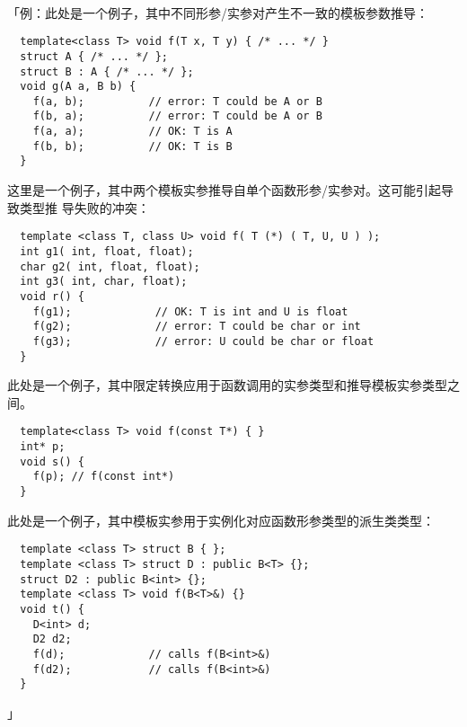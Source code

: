 \paragraph{}
「例：此处是一个例子，其中不同形参/实参对产生不一致的模板参数推导：
\begin{lstlisting}
  template<class T> void f(T x, T y) { /* ... */ }
  struct A { /* ... */ };
  struct B : A { /* ... */ };
  void g(A a, B b) {
    f(a, b);          // error: T could be A or B
    f(b, a);          // error: T could be A or B
    f(a, a);          // OK: T is A
    f(b, b);          // OK: T is B
  }
\end{lstlisting}
这里是一个例子，其中两个模板实参推导自单个函数形参/实参对。这可能引起导致类型推
导失败的冲突：
\begin{lstlisting}
  template <class T, class U> void f( T (*) ( T, U, U ) );
  int g1( int, float, float);
  char g2( int, float, float);
  int g3( int, char, float);
  void r() {
    f(g1);             // OK: T is int and U is float
    f(g2);             // error: T could be char or int
    f(g3);             // error: U could be char or float
  }
\end{lstlisting}
此处是一个例子，其中限定转换应用于函数调用的实参类型和推导模板实参类型之间。
\begin{lstlisting}
  template<class T> void f(const T*) { }
  int* p;
  void s() {
    f(p); // f(const int*)
  }
\end{lstlisting}
此处是一个例子，其中模板实参用于实例化对应函数形参类型的派生类类型：
\begin{lstlisting}
  template <class T> struct B { };
  template <class T> struct D : public B<T> {};
  struct D2 : public B<int> {};
  template <class T> void f(B<T>&) {}
  void t() {
    D<int> d;
    D2 d2;
    f(d);             // calls f(B<int>&)
    f(d2);            // calls f(B<int>&)
  }
\end{lstlisting}」

